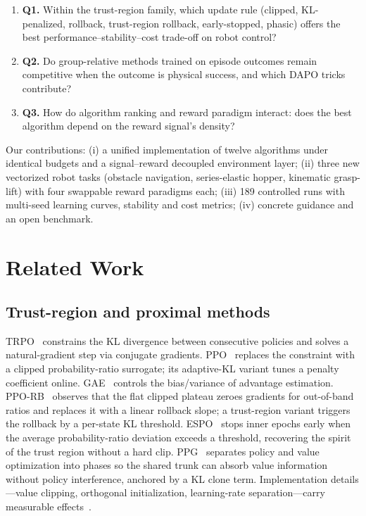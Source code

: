 \documentclass[journal,twoside]{IEEEtran}
\newcommand{\ppo}{\textsc{PPO}}
\newcommand{\trpo}{\textsc{TRPO}}
\begin{document}
\begin{enumerate}
\item \textbf{Q1.} Within the trust-region family, which update rule
(clipped, KL-penalized, rollback, trust-region rollback, early-stopped,
phasic) offers the best performance--stability--cost trade-off on robot
control?
\item \textbf{Q2.} Do group-relative methods trained on episode outcomes
remain competitive when the outcome is physical success, and which DAPO
tricks contribute?
\item \textbf{Q3.} How do algorithm ranking and reward paradigm interact:
does the best algorithm depend on the reward signal's density?
\end{enumerate}

Our contributions: (i) a unified implementation of twelve algorithms under
identical budgets and a signal--reward decoupled environment layer; (ii)
three new vectorized robot tasks (obstacle navigation, series-elastic
hopper, kinematic grasp-lift) with four swappable reward paradigms each;
(iii) 189 controlled runs with multi-seed learning curves, stability and
cost metrics; (iv) concrete guidance and an open benchmark.

\section{Related Work}
\subsection{Trust-region and proximal methods}
\trpo{}~\cite{schulman2015trpo} constrains the KL divergence between
consecutive policies and solves a natural-gradient step via conjugate
gradients. \ppo{}~\cite{schulman2017ppo} replaces the constraint with a
clipped probability-ratio surrogate; its adaptive-KL variant tunes a
penalty coefficient online. GAE~\cite{schulman2016gae} controls the
bias/variance of advantage estimation. \ppo{}-RB~\cite{yuan2020rollback}
observes that the flat clipped plateau zeroes gradients for
out-of-band ratios and replaces it with a linear rollback slope;
a trust-region variant triggers the rollback by a per-state KL threshold.
ESPO~\cite{li2023espo} stops inner epochs early when the average
probability-ratio deviation exceeds a threshold, recovering the spirit of
the trust region without a hard clip. PPG~\cite{cobbe2021ppg} separates
policy and value optimization into phases so the shared trunk can absorb
value information without policy interference, anchored by a KL clone term.
Implementation details---value clipping, orthogonal initialization,
learning-rate separation---carry measurable
effects~\cite{engstrom2020implementation,huang2022closer}.
\end{document}
